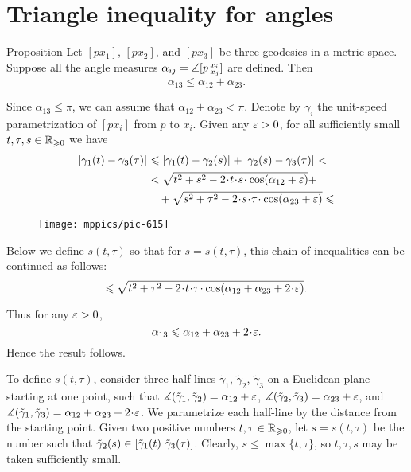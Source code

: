 \section{Triangle inequality for angles}

\begin{thm}{Proposition}\label{claim:angle-3angle-inq}
Let  $[px_1]$, $[px_2]$, and $[px_3]$ be three geodesics in a metric space.
Suppose all the angle measures $\alpha_{i j}=\measuredangle[p\,{}^{x_i}_{x_j}]$ are defined.
Then 
\[\alpha_{13}\le \alpha_{12}+\alpha_{23}.\]

\end{thm}



Since $\alpha_{13}\le\pi$, we can assume that $\alpha_{12}+\alpha_{23}< \pi$.
Denote by $\gamma_i$ the unit-speed parametrization of $[px_i]$ from $p$ to $x_i$.
Given any $\varepsilon>0$, for all sufficiently small $t,\tau,s\in\mathbb{R}_{\geqslant0}$ we have
\begin{align*}
\dist{\gamma_1(t)}{\gamma_3(\tau)}{}
&\le 
\dist{\gamma_1(t)}{\gamma_2(s)}{}+\dist{\gamma_2(s)}{\gamma_3(\tau)}{}<\\
&<
\sqrt{t^2+s^2-2\cdot t\cdot  s\cdot \cos(\alpha_{12}+\eps)} +
\\
&\quad+\sqrt{s^2+\tau^2-2\cdot s\cdot \tau\cdot \cos(\alpha_{23}+\eps)}\le
\end{align*}

\begin{wrapfigure}{o}{30 mm}
\vskip-16mm
\centering
\texttt{[image: mppics/pic-615]}
\vskip0mm
\end{wrapfigure}

Below we define 
$s(t,\tau)$ so that for 
$s=s(t,\tau)$, this chain of inequalities can be continued as follows:
\[\le
\sqrt{t^2+\tau^2-2\cdot t\cdot \tau\cdot \cos(\alpha_{12}+\alpha_{23}+2\cdot \eps)}.
\]

Thus for any $\varepsilon>0$, 
\[\alpha_{13}\le \alpha_{12}+\alpha_{23}+2\cdot \eps.\]
Hence the result follows.

To define $s(t,\tau)$, consider three half-lines $\tilde \gamma_1$, $\tilde \gamma_2$, $\tilde \gamma_3$ on a Euclidean plane starting at one point, such that
$\measuredangle(\tilde \gamma_1,\tilde \gamma_2)=\alpha_{12}+\varepsilon$,
$\measuredangle(\tilde \gamma_2,\tilde \gamma_3)=\alpha_{23}+\varepsilon$,
and $\mangle(\tilde \gamma_1,\tilde \gamma_3)\z=\alpha_{12}\z+\alpha_{23}\z+2\cdot \eps$.
We parametrize each half-line by the distance from the starting point.
Given two positive numbers $t,\tau\in\mathbb{R}_{\geqslant0}$, let $s=s(t,\tau)$ be 
the number such that 
$\tilde \gamma_2(s)\in[\tilde \gamma_1(t)\ \tilde \gamma_3(\tau)]$. 
Clearly, $s\le\max\{t,\tau\}$, so $t,\tau,s$ may be taken sufficiently small.
\qeds 

